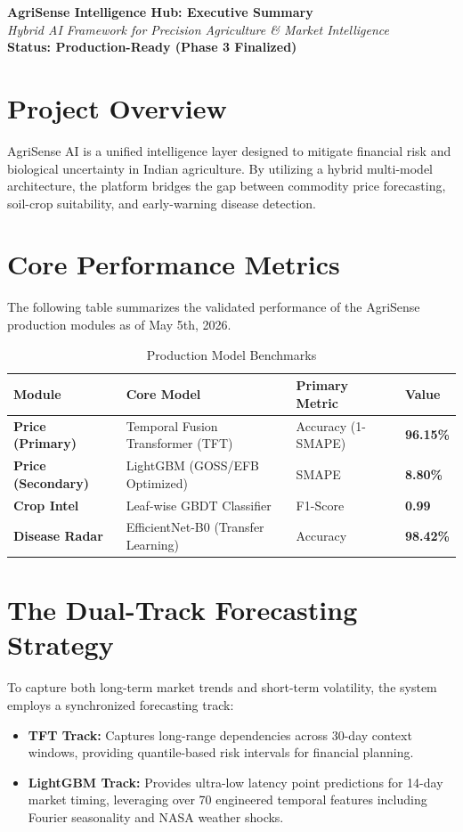 \documentclass[11pt,a4paper]{article}
\begin{document}
\begin{center}
    {\LARGE \textbf{AgriSense Intelligence Hub: Executive Summary}} \\
    \vspace{0.2cm}
    {\large \textit{Hybrid AI Framework for Precision Agriculture \& Market Intelligence}} \\
    \vspace{0.5cm}
    \textbf{Status: Production-Ready (Phase 3 Finalized)}
\end{center}

\section{Project Overview}
AgriSense AI is a unified intelligence layer designed to mitigate financial risk and biological uncertainty in Indian agriculture. By utilizing a hybrid multi-model architecture, the platform bridges the gap between commodity price forecasting, soil-crop suitability, and early-warning disease detection.

\section{Core Performance Metrics}
The following table summarizes the validated performance of the AgriSense production modules as of May 5th, 2026.

\begin{table}[h!]
\centering
\begin{tabular}{@{}llll@{}}
\toprule
\textbf{Module} & \textbf{Core Model} & \textbf{Primary Metric} & \textbf{Value} \\ \midrule
\textbf{Price (Primary)} & Temporal Fusion Transformer (TFT) & Accuracy (1-SMAPE) & \textbf{96.15\%} \\
\textbf{Price (Secondary)} & LightGBM (GOSS/EFB Optimized) & SMAPE & \textbf{8.80\%} \\
\textbf{Crop Intel} & Leaf-wise GBDT Classifier & F1-Score & \textbf{0.99} \\
\textbf{Disease Radar} & EfficientNet-B0 (Transfer Learning) & Accuracy & \textbf{98.42\%} \\ \bottomrule
\end{tabular}
\caption{Production Model Benchmarks}
\end{table}

\section{The Dual-Track Forecasting Strategy}
To capture both long-term market trends and short-term volatility, the system employs a synchronized forecasting track:
\begin{itemize}[leftmargin=*]
    \item \textbf{TFT Track:} Captures long-range dependencies across 30-day context windows, providing quantile-based risk intervals for financial planning.
    \item \textbf{LightGBM Track:} Provides ultra-low latency point predictions for 14-day market timing, leveraging over 70 engineered temporal features including Fourier seasonality and NASA weather shocks.
\end{itemize}
\end{document}
